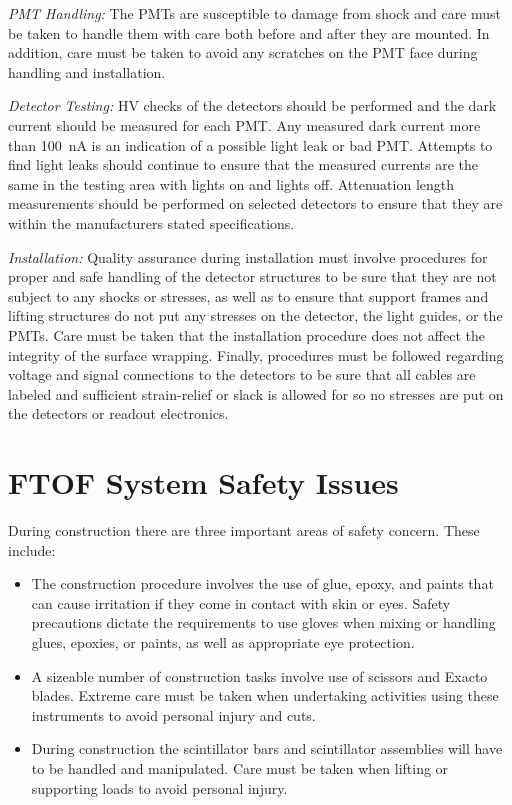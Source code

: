 \vskip 0.5cm

{\it PMT Handling:} The PMTs are susceptible to damage from shock and
care must be taken to handle them with care both before and after they
are mounted.  In addition, care must be taken to avoid any scratches on
the PMT face during handling and installation.

\vskip 0.5cm

{\it Detector Testing:} HV checks of the detectors should be performed
and the dark current should be measured for each PMT.  Any measured
dark current more than 100~nA is an indication of a possible light
leak or bad PMT.  Attempts to find light leaks should continue to ensure 
that the measured currents are the same in the testing area with lights on 
and lights off.  Attenuation length measurements should be performed on
selected detectors to ensure that they are within the manufacturers
stated specifications.

\vskip 0.5cm

{\it Installation:} Quality assurance during installation must involve
procedures for proper and safe handling of the detector structures to
be sure that they are not subject to any shocks or stresses, as well as
to ensure that support frames and lifting structures do not put any
stresses on the detector, the light guides, or the PMTs.  Care must be
taken that the installation procedure does not affect the integrity of
the surface wrapping.  Finally, procedures must be followed regarding
voltage and signal connections to the detectors to be sure that all
cables are labeled and sufficient strain-relief or slack is allowed for
so no stresses are put on the detectors or readout electronics. 

\section{FTOF System Safety Issues}

During construction there are three important areas of safety concern.  
These include:

\begin{itemize}

\item The construction procedure involves the use of glue, epoxy, and
paints that can cause irritation if they come in contact with skin
or eyes.  Safety precautions dictate the requirements to use gloves when
mixing or handling glues, epoxies, or paints, as well as appropriate eye 
protection.

\item A sizeable number of construction tasks involve use of scissors
and Exacto blades.  Extreme care must be taken when undertaking activities
using these instruments to avoid personal injury and cuts.

\item During construction the scintillator bars and scintillator
assemblies will have to be handled and manipulated.  Care must be taken
when lifting or supporting loads to avoid personal injury.

\end{itemize}

